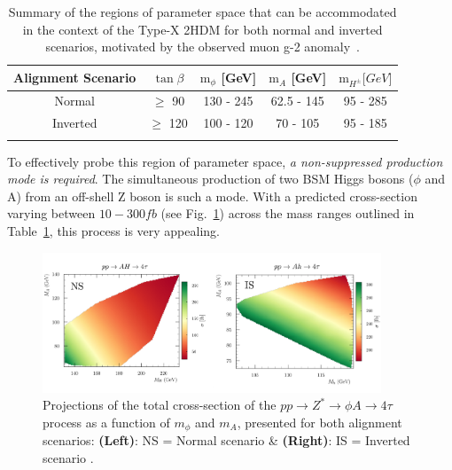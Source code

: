 \begin{table}[h]
\centering
\renewcommand{\arraystretch}{1.5} %
\setlength{\tabcolsep}{12pt} %
\begin{tabular}{|c|c|c|c|c|}
\hline
Alignment Scenario & $\tan{\beta}$ & $\text{m}_\phi$ {[}GeV{]} & $\text{m}_A$ {[}GeV{]} & $\text{m}_{H^\pm} {[}GeV{]}$ \\ \hline \hline
Normal             & $\geq$ 90     & 130 - 245                 & 62.5 - 145             & 95 - 285                     \\ \arrayrulecolor{lightgray} \hline
Inverted           & $\geq$ 120    & 100 - 120                 & 70 - 105               & 95 - 185 \\ \arrayrulecolor{black} \hline
\end{tabular}
\caption[Allowed parameter space for Type-X Two-Higgs Doublet Model scenarios accommodating the muon g-2]{Summary of the regions of parameter space that can be accommodated in the context of the Type-X 2HDM for both normal and inverted scenarios, motivated by the observed muon g-2 anomaly~\cite{TypeX_2HDM}.}
\label{Table:Chapter2_TypeX-ParameterSpace}
\end{table}

To effectively probe this region of parameter space, \textit{a non-suppressed production mode is required}. The simultaneous production of two \ac{BSM} Higgs bosons ($\phi$ and A) from an off-shell Z boson is such a mode. With a predicted cross-section varying between $10-300\unit{fb}$ (see Fig.~\ref{Figure:Chapter2_4tau_ProductionXS}) across the mass ranges outlined in Table~\ref{Table:Chapter2_TypeX-ParameterSpace}, this process is very appealing. 

\begin{figure}[!htbp]
\centering
    \includegraphics[width= 0.9\textwidth]{Figures/Chapter2/4tau_Production_XS.pdf}
    \caption[Projections of the total cross-section of the $pp \to Z^* \to \phi A \to 4\tau$ process]{Projections of the total cross-section of the $pp \to Z^* \to \phi A \to 4\tau$ process as a function of $m_\phi$ and $m_A$, presented for both alignment scenarios: \textbf{(Left)}: NS = Normal scenario \& \textbf{(Right)}: IS = Inverted scenario \cite{TypeX_2HDM}.}
    \label{Figure:Chapter2_4tau_ProductionXS}
\end{figure}

